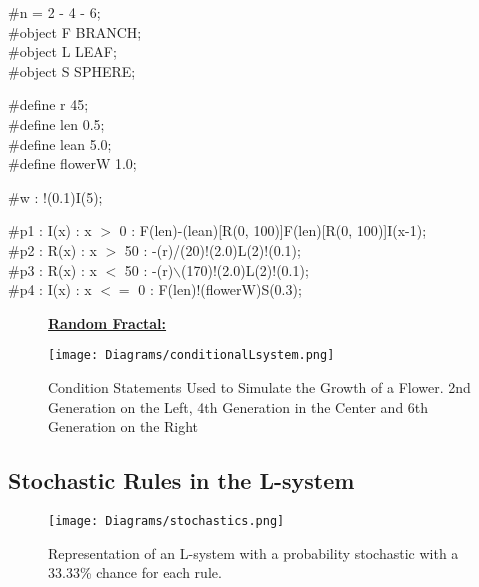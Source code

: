 \begin{flushleft}
\vspace{5mm}

\#n = 2 - 4 - 6; \\
\#object F BRANCH; \\
\#object L LEAF; \\
\#object S SPHERE; \\

\vspace{5mm}

\#define r 45; \\
\#define len 0.5; \\
\#define lean 5.0; \\
\#define flowerW 1.0; \\

\vspace{5mm}

\#w : !(0.1)I(5); \\

\vspace{5mm}

\#p1 : I(x) : x $>$ 0 : F(len)-(lean)[R({0, 100})]F(len)[R({0, 100})]I(x-1);\\
\#p2 : R(x) : x $>$ 50 : -(r)/(20)!(2.0)L(2)!(0.1); \\
\#p3 : R(x) : x $<$ 50 : -(r)$\backslash$(170)!(2.0)L(2)!(0.1); \\
\#p4 : I(x) : x $<=$ 0 : F(len)!(flowerW)S(0.3); \\

\vspace{5mm}

\begin{figure}[htbp]
\raggedright
\textbf{\underline{Random Fractal:}} \\
	{\centering
		\vspace{7px}
		\texttt{[image: Diagrams/conditionalLsystem.png]}
		\caption{Condition Statements Used to Simulate the Growth of a Flower. 2nd Generation on the Left, 4th Generation in the Center and 6th Generation on the Right}
	}
\end{figure}

\FloatBarrier

\end{flushleft}

\subsection{Stochastic Rules in the L-system}

\begin{flushleft}

\begin{figure}[htbp]
	{\centering
		\vspace{7px}
		\texttt{[image: Diagrams/stochastics.png]}
		\caption{Representation of an L-system with a probability stochastic with a 33.33\% chance for each rule.}
	}
\end{figure}

\FloatBarrier


\end{flushleft}






